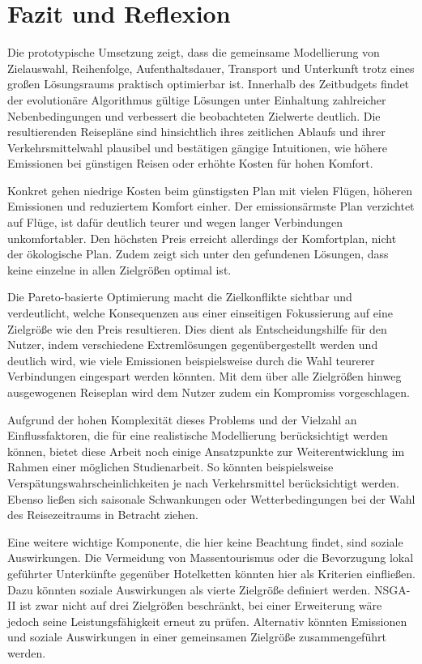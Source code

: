 \section{Fazit und Reflexion}
\label{sec:fazit}

Die prototypische Umsetzung zeigt, dass die gemeinsame Modellierung von
Zielauswahl, Reihenfolge, Aufenthaltsdauer, Transport und Unterkunft trotz eines großen Lösungsraums praktisch optimierbar ist. Innerhalb des Zeitbudgets findet der evolutionäre
Algorithmus gültige Lösungen unter Einhaltung zahlreicher Nebenbedingungen
und verbessert die beobachteten Zielwerte deutlich. Die resultierenden
Reisepläne sind hinsichtlich ihres zeitlichen Ablaufs und ihrer
Verkehrsmittelwahl plausibel und bestätigen gängige Intuitionen, wie höhere Emissionen bei günstigen Reisen oder erhöhte Kosten für hohen Komfort.

Konkret gehen niedrige Kosten beim günstigsten Plan mit vielen Flügen, höheren Emissionen und reduziertem Komfort einher. Der emissionsärmste Plan verzichtet auf Flüge, ist dafür deutlich teurer und wegen langer Verbindungen unkomfortabler. Den höchsten Preis erreicht allerdings der Komfortplan, nicht der ökologische Plan. Zudem zeigt sich unter den gefundenen Lösungen, dass keine einzelne in allen Zielgrößen optimal ist.

Die Pareto-basierte Optimierung macht die Zielkonflikte sichtbar und verdeutlicht, welche Konsequenzen aus einer einseitigen Fokussierung auf eine Zielgröße wie den Preis resultieren. Dies dient als Entscheidungshilfe für den Nutzer, indem verschiedene Extremlösungen gegenübergestellt werden und deutlich wird, wie viele Emissionen beispielsweise durch die Wahl teurerer Verbindungen eingespart werden könnten. Mit dem über alle Zielgrößen hinweg ausgewogenen Reiseplan wird dem Nutzer zudem ein Kompromiss vorgeschlagen.

Aufgrund der hohen Komplexität dieses Problems und der Vielzahl an Einflussfaktoren, die für eine realistische Modellierung berücksichtigt werden können, bietet diese Arbeit noch einige Ansatzpunkte zur Weiterentwicklung im Rahmen einer möglichen Studienarbeit. So könnten beispielsweise Verspätungswahrscheinlichkeiten je nach Verkehrsmittel berücksichtigt werden. Ebenso ließen sich saisonale Schwankungen oder Wetterbedingungen bei der Wahl des Reisezeitraums in Betracht ziehen.

Eine weitere wichtige Komponente, die hier keine Beachtung findet, sind soziale Auswirkungen. Die Vermeidung von Massentourismus oder die Bevorzugung lokal geführter Unterkünfte gegenüber Hotelketten könnten hier als Kriterien einfließen. Dazu könnten soziale Auswirkungen als vierte Zielgröße definiert werden. NSGA-II ist zwar nicht auf drei Zielgrößen beschränkt, bei einer Erweiterung wäre jedoch seine Leistungsfähigkeit erneut zu prüfen. Alternativ könnten Emissionen und soziale Auswirkungen in einer gemeinsamen Zielgröße zusammengeführt werden.

